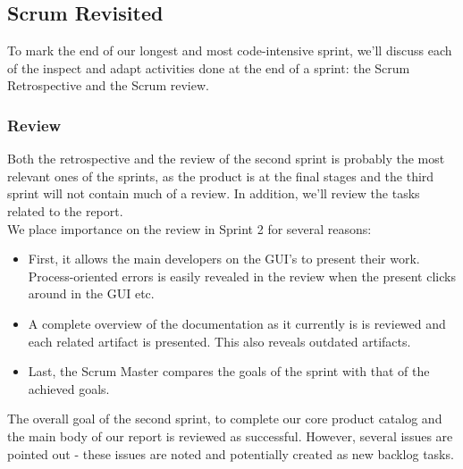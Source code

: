 \subsection{Scrum Revisited}
To mark the end of our longest and most code-intensive sprint, we’ll discuss each of the inspect and adapt activities done at the end of a sprint: the Scrum Retrospective and the Scrum review.
\subsubsection{Review}
Both the retrospective and the review of the second sprint is probably the most relevant ones of the sprints, as the product is at the final stages and the third sprint will not contain much of a review. In addition, we’ll review the tasks related to the report. \\
We place importance on the review in Sprint 2 for several reasons:
\begin{itemize}
\item First, it allows the main developers on the GUI’s to present their work. Process-oriented errors is easily revealed in the review when the present clicks around in the GUI etc.
\item A complete overview of the documentation as it currently is is reviewed and each related artifact is presented. This also reveals outdated artifacts.
\item Last, the Scrum Master compares the goals of the sprint with that of the achieved goals. 
\end{itemize}
The overall goal of the second sprint, to complete our core product catalog and the main body of our report is reviewed as successful. However, several issues are pointed out - these issues are noted and potentially created as new backlog tasks.
